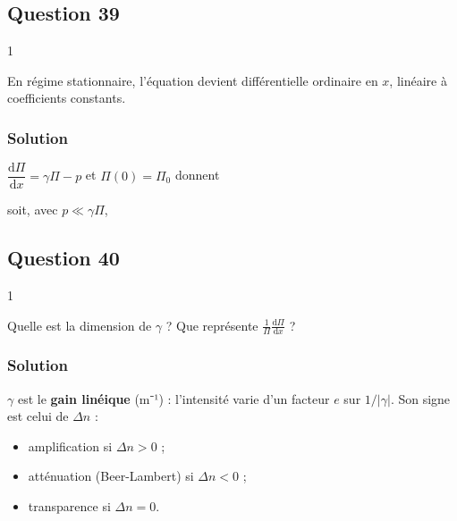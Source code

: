 \documentclass[11pt,a4paper]{article}
\providecommand{\tightlist}{\setlength{\itemsep}{0pt}\setlength{\parskip}{0pt}}
\newcommand{\equationajustee}[1]{%
  \sbox{\boiteequation}{$\displaystyle #1$}%
  \ifdim\wd\boiteequation>\linewidth
    \[\resizebox{\linewidth}{!}{\usebox{\boiteequation}}\]%
  \else
    \[#1\]%
  \fi}
\begin{document}
\hypertarget{question-39}{%
\subsection{Question 39}\label{question-39}}

\begin{indication}{1}

En régime stationnaire, l'équation devient différentielle ordinaire en \(x\), linéaire à coefficients constants.

\end{indication}

\hypertarget{solution-38}{%
\subsubsection{Solution}\label{solution-38}}

\(\dfrac{\mathrm d\Pi}{\mathrm dx}=\gamma\Pi-p\) et \(\Pi(0)=\Pi_0\) donnent

\equationajustee{\Pi(x)=\left(\Pi_0-\frac p\gamma\right)e^{\gamma x}+\frac p\gamma}

soit, avec \(p\ll\gamma\Pi\),

\equationajustee{\boxed{\Pi(x)=\Pi_0e^{\gamma x}}}

\hypertarget{question-40}{%
\subsection{Question 40}\label{question-40}}

\begin{indication}{1}

Quelle est la dimension de \(\gamma\) ? Que représente \(\frac1\Pi\frac{\mathrm d\Pi}{\mathrm dx}\) ?

\end{indication}

\hypertarget{solution-39}{%
\subsubsection{Solution}\label{solution-39}}

\(\gamma\) est le \textbf{gain linéique} (m⁻¹) : l'intensité varie d'un facteur \(e\) sur \(1/\lvert\gamma\rvert\). Son signe est celui de \(\Delta n\) :

\begin{itemize}
\tightlist
\item
  amplification si \(\Delta n>0\) ;
\item
  atténuation (Beer-Lambert) si \(\Delta n<0\) ;
\item
  transparence si \(\Delta n=0\).
\end{itemize}
\end{document}
